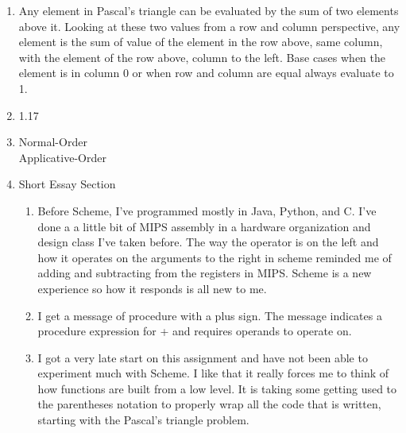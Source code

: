 \documentclass[a4paper,12pt]{article}
\begin{document}
\begin{enumerate}
\begin{enumerate}
		
	\end{enumerate}
	
	\newpage
	\item  
	
	Any element in Pascal's triangle can be evaluated by the sum of two elements above it. Looking at these two values from a row and column perspective, any element is the sum of value of the element in the row above, same column, with the element of the row above, column to the left. Base cases when the element is in column 0 or when row and column are equal always evaluate to 1.
	
	\item 1.17
	
	\item Normal-Order \\
	
	\newpage
	Applicative-Order \\
	
	
	\item Short Essay Section
	
	\begin{enumerate}
		\item Before Scheme, I've programmed mostly in Java, Python, and C. I've done a a little bit of MIPS assembly in a hardware organization and design class I've taken before. The way the operator is on the left and how it operates on the arguments to the right in scheme reminded me of adding and subtracting from the registers in MIPS. Scheme is a new experience so how it responds is all new to me.
		\item I get a message of procedure with a plus sign. The message indicates a procedure expression for + and requires operands to operate on.
		\item I got a very late start on this assignment and have not been able to experiment much with Scheme. I like that it really forces me to think of how functions are built from a low level. It is taking some getting used to the parentheses notation to properly wrap all the code that is written, starting with the Pascal's triangle problem.
	\end{enumerate}

\end{enumerate}

%

%
	
\end{document}
